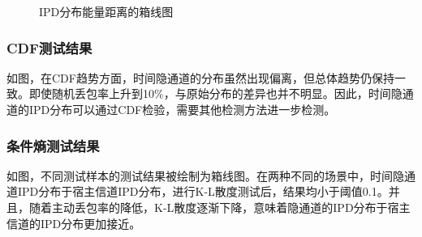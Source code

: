 {	\begin{figure}
        \centering
        \caption{IPD分布能量距离的箱线图}
        \label{fig:3:result:ipd:ed}
	\end{figure}
}

\subsubsection{CDF测试结果}
\label{chap:analyze:result:ipd:cdf}

如图，在CDF趋势方面，时间隐通道的分布虽然出现偏离，但总体趋势仍保持一致。即使随机丢包率上升到10\%，与原始分布的差异也并不明显。因此，时间隐通道的IPD分布可以通过CDF检验，需要其他检测方法进一步检测。

\subsubsection{条件熵测试结果}
\label{chap:analyze:result:ipd:kld}

如图，不同测试样本的测试结果被绘制为箱线图。在两种不同的场景中，时间隐通道IPD分布于宿主信道IPD分布，进行K-L散度测试后，结果均小于阈值0.1。并且，随着主动丢包率的降低，K-L散度逐渐下降，意味着隐通道的IPD分布于宿主信道的IPD分布更加接近。

